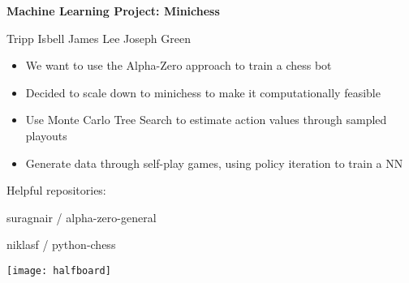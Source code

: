 \documentclass[notitlepage, 8pt]{slides}
\title{}
\author{}
\begin{document}
\textbf{Machine Learning Project: Minichess}

\begin{small}
Tripp Isbell \hspace{1cm} James Lee \hspace{1cm} Joseph Green
\vspace{0.5cm}
\begin{itemize}\setlength\itemsep{0.5em}
	\item We want to use the Alpha-Zero approach to train a chess bot
	\item Decided to scale down to minichess to make it computationally feasible
	\item Use Monte Carlo Tree Search to estimate action values through sampled playouts
	\item Generate data through self-play games, using policy iteration to train a NN
\end{itemize}

\end{small}
\begin{minipage}{0.5\textwidth}
Helpful repositories:
\vspace{0.5cm}

suragnair / alpha-zero-general

\vspace{0.5cm}
niklasf / python-chess
\end{minipage}
\begin{minipage}{0.45\textwidth}
\texttt{[image: halfboard]}
\end{minipage}
\end{document}
